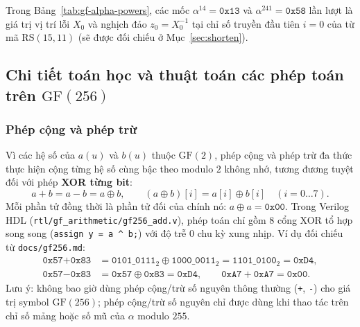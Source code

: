 \documentclass[12pt,a4paper]{report}
\begin{document}
Trong Bảng~\ref{tab:gf-alpha-powers}, các mốc $\alpha^{14} = \texttt{0x13}$ và $\alpha^{241} = \texttt{0x58}$ lần lượt là giá trị vị trí lỗi $X_0$ và nghịch đảo $z_0 = X_0^{-1}$ tại chỉ số truyền đầu tiên $i = 0$ của từ mã $\text{RS}(15,11)$ (sẽ được đối chiếu ở Mục~\ref{sec:shorten}).

\subsection{Chi tiết toán học và thuật toán các phép toán trên \texorpdfstring{$\text{GF}(256)$}{GF(256)}}

\subsubsection{Phép cộng và phép trừ}
Vì các hệ số của $a(u)$ và $b(u)$ thuộc $\text{GF}(2)$, phép cộng và phép trừ đa thức thực hiện cộng từng hệ số cùng bậc theo modulo $2$ không nhớ, tương đương tuyệt đối với phép \textbf{XOR từng bit}:
\begin{equation}
    a + b = a - b = a \oplus b, \qquad (a \oplus b)[i] = a[i] \oplus b[i] \quad (i = 0 \dots 7).
    \label{eq:gf-add-sub}
\end{equation}
Mỗi phần tử đồng thời là phần tử đối của chính nó: $a \oplus a = \texttt{0x00}$. Trong Verilog HDL (\texttt{rtl/gf\_arithmetic/gf256\_add.v}), phép toán chỉ gồm 8 cổng XOR tổ hợp song song (\texttt{assign y = a \^{} b;}) với độ trễ $0$ chu kỳ xung nhịp. Ví dụ đối chiếu từ \texttt{docs/gf256.md}:
\begin{align*}
    \texttt{0x57} + \texttt{0x83} &= \texttt{0101\_0111}_2 \oplus \texttt{1000\_0011}_2 = \texttt{1101\_0100}_2 = \texttt{0xD4}, \\
    \texttt{0x57} - \texttt{0x83} &= \texttt{0x57} \oplus \texttt{0x83} = \texttt{0xD4}, \qquad \texttt{0xA7} + \texttt{0xA7} = \texttt{0x00}.
\end{align*}
Lưu ý: không bao giờ dùng phép cộng/trừ số nguyên thông thường (\texttt{+}, \texttt{-}) cho giá trị symbol $\text{GF}(256)$; phép cộng/trừ số nguyên chỉ được dùng khi thao tác trên chỉ số mảng hoặc số mũ của $\alpha$ modulo $255$.
\end{document}
